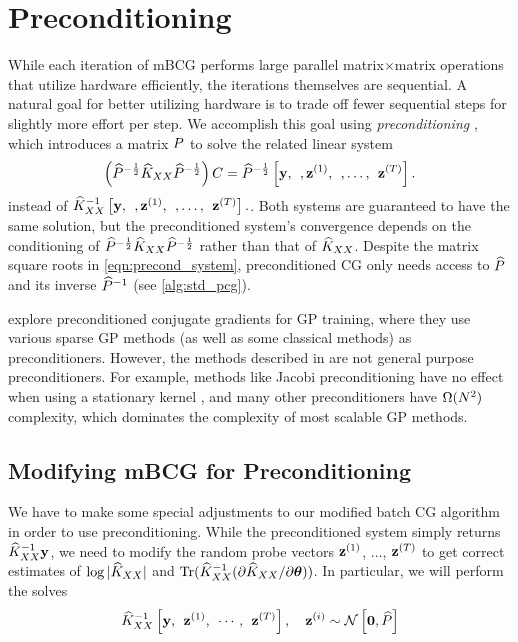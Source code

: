 \section{Preconditioning}
\label{sec:preconditioning}

While each iteration of mBCG performs large parallel matrix$\times$matrix operations that utilize hardware efficiently, the iterations themselves are sequential.
A natural goal for better utilizing hardware is to trade off fewer sequential steps for slightly more effort per step.
We accomplish this goal using \emph{preconditioning} \citep[e.g.][]{demmel1997applied,saad2003iterative,van2003iterative,golub2012matrix}, which introduces a matrix $P$ to solve the related linear system
\begin{equation}
  \left( \widehat{P}^{- \frac 1 2} \widehat{K}_{XX} \widehat{P}^{- \frac 1 2}\right) C = \widehat{P}^{- \frac 1 2} \left[ \mathbf{y}, \:\:, \mathbf{z}^{(1)}, \:\:, \ldots, \:\: \mathbf{z}^{(T)} \right].
  \label{eqn:precond_system}
\end{equation}
instead of $\widehat{K}_{XX}^{-1} \left[  \mathbf{y}, \:\:, \mathbf{z}^{(1)}, \:\:, \ldots, \:\: \mathbf{z}^{(T)} \right].$.
Both systems are guaranteed to have the same solution, but the preconditioned system's convergence depends on the conditioning of $\widehat{P}^{- \frac 1 2} \widehat{K}_{XX} \widehat{P}^{- \frac 1 2}$ rather than that of $\widehat{K}_{XX}$.
Despite the matrix square roots in \cref{eqn:precond_system}, preconditioned CG only needs access to $\widehat{P}$ and its inverse $\widehat{P}^{-1}$ (see \cref{alg:std_pcg}).

\citet{cutajar2016preconditioning} explore preconditioned conjugate gradients for GP training, where they use various sparse GP methods (as well as some classical methods) as preconditioners.
However, the methods described in \citet{cutajar2016preconditioning} are not general purpose preconditioners.
For example, methods like Jacobi preconditioning have no effect when using a stationary kernel \cite{cutajar2016preconditioning,wilson2015thoughts}, and many other preconditioners have $\bigomega{N^{2}}$ complexity, which dominates the complexity of most scalable GP methods.



\subsection{Modifying mBCG for Preconditioning}
\label{sec:precond_requirements}
We have to make some special adjustments to our modified batch CG algorithm in order to use preconditioning.
While the preconditioned system simply returns $\widehat{K}_{XX}^{-1} \mathbf{y}$, we need to modify the random probe vectors $\mathbf{z}^{(1)}$, $\ldots$, $\mathbf{z}^{(T)}$ to get correct estimates of $\log \vert \widehat{K}_{XX} \vert$ and $\tr{ \trainK^{-1} ( \partial \trainK / \partial \btheta) }$.
In particular, we will perform the solves
%
\begin{equation}
  \label{eqn:mod_cg_call_precond}
  \trainK^{-1} \left[ \by, \:\: \bz^{(1)}, \:\: \cdots, \:\: \bz^{(T)} \right], \quad \bz^{(i)} \sim \normaldist{\bzero}{\trainP}
\end{equation}

